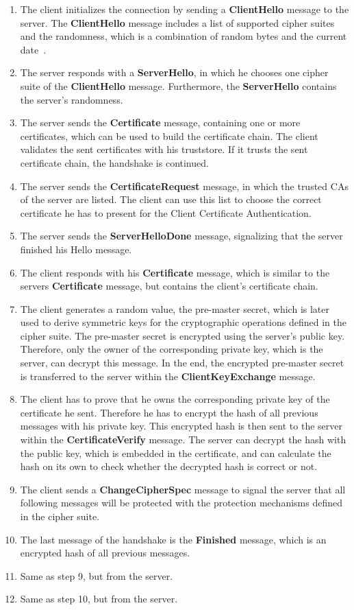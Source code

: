 \begin{enumerate}
	\item The client initializes the connection by sending a \textbf{ClientHello} message to the server.
		The \textbf{ClientHello} message includes a list of supported cipher suites and the randomness, which is a combination of random bytes and the current date~\cite{mediumtls}.
	\item The server responds with a \textbf{ServerHello}, in which he chooses one cipher suite of the \textbf{ClientHello} message.
		Furthermore, the \textbf{ServerHello} contains the server's randomness.
	\item The server sends the \textbf{Certificate} message, containing one or more certificates, which can be used to build the certificate chain.
		The client validates the sent certificates with his truststore.
		If it trusts the sent certificate chain, the handshake is continued.
	\item The server sends the \textbf{CertificateRequest} message, in which the trusted CAs of the server are listed.
		The client can use this list to choose the correct certificate he has to present for the Client Certificate Authentication.
	\item The server sends the \textbf{ServerHelloDone} message, signalizing that the server finished his Hello message.
	\item The client responds with his \textbf{Certificate} message, which is similar to the servers \textbf{Certificate} message, but contains the client's certificate chain.
	\item The client generates a random value, the pre-master secret, which is later used to derive symmetric keys for the cryptographic operations defined in the cipher suite.
		The pre-master secret is encrypted using the server's public key.
		Therefore, only the owner of the corresponding private key, which is the server, can decrypt this message.
		In the end, the encrypted pre-master secret is transferred to the server within the \textbf{ClientKeyExchange} message.
	\item The client has to prove that he owns the corresponding private key of the certificate he sent.
		Therefore he has to encrypt the hash of all previous messages with his private key.
		This encrypted hash is then sent to the server within the \textbf{CertificateVerify} message.
		The server can decrypt the hash with the public key, which is embedded in the certificate, and can calculate the hash on its own to check whether the decrypted hash is correct or not.
	\item The client sends a \textbf{ChangeCipherSpec} message to signal the server that all following messages will be protected with the protection mechanisms defined in the cipher suite.
	\item The last message of the handshake is the \textbf{Finished} message, which is an encrypted hash of all previous messages.
	\item Same as step 9, but from the server.
	\item Same as step 10, but from the server.
\end{enumerate}
